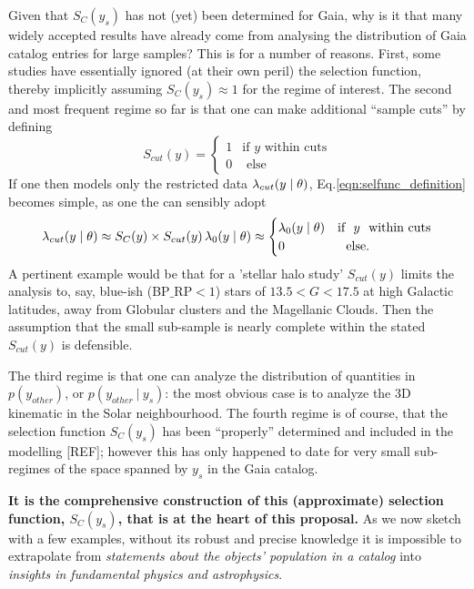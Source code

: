 Given that $S_C(y_s)$ has not (yet) been determined for Gaia, why is it that many %
widely accepted results have already come from analysing the distribution of Gaia catalog entries for large samples? This is for a number of reasons. First, some studies have essentially ignored (at their own peril) the selection function, thereby implicitly assuming $S_C(y_s)\approx 1$ for the regime of interest. The second and most frequent regime so far is that one can make additional ``sample cuts'' by defining
\begin{equation*}
    S_{cut}(y) = \begin{cases} 1 &\mbox{if\ \ } y \mbox{\ \ within cuts} \\ 
0 &\mbox{\ \ else} \end{cases}
\end{equation*}
If one then models only the restricted data $\lambda_{cut}(y\mid\theta)$, Eq.\ref{eqn:selfunc_definition} becomes simple, as one the can sensibly adopt
\begin{equation*}
    \lambda_{cut}(y\mid\theta) \approx S_C(y) \times S_{cut}(y)\, \lambda_0(y\mid \theta) \approx  \begin{cases}  \lambda_0(y\mid \theta) &\mbox{if\ \ } y \mbox{\ \ within cuts} \\ 
0 &\mbox{\ \ else.} \end{cases}
\end{equation*}
A pertinent example would be that for a 'stellar halo study' $S_{cut}(y)$ limits the analysis to, say, blue-ish (BP$\_$RP$<1$) stars of $13.5<G<17.5$ at high Galactic latitudes, away from Globular clusters and the Magellanic Clouds. Then the assumption that the small sub-sample is nearly complete within the stated $S_{cut}(y)$  is defensible.

The third regime is that one can analyze the distribution of quantities in $p(y_{other})$, or $p(y_{other}~|~y_s)$: the most obvious case is to analyze the 3D kinematic in the Solar neighbourhood. The fourth regime is of course, that the selection function $S_C(y_s)$ has been ``properly'' determined and included in the modelling [REF]; however this has only happened to date for very small sub-regimes of the space spanned by $y_s$ in the Gaia catalog.


\textbf{It is the comprehensive construction of this (approximate) selection function, $S_C(y_s)$, that is at the heart of this proposal.} As we now sketch with a few examples, without its robust and precise knowledge it is impossible to extrapolate from \textit{statements about the objects' population in a catalog} into \textit{insights in fundamental physics and astrophysics}.

